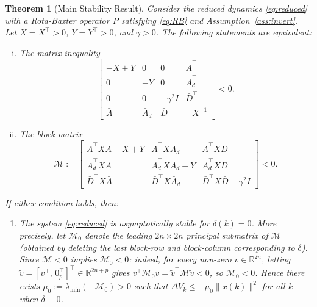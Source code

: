 \documentclass[10pt]{amsart}
\numberwithin{equation}{section}
\newtheorem{theorem}{Theorem}[section]
\begin{document}
\begin{theorem}[Main Stability Result]\label{thm:stability}
Consider the reduced dynamics \eqref{eq:reduced} with a Rota-Baxter operator \(P\)
satisfying \eqref{eq:RB} and Assumption~\ref{ass:invert}. Let $X = X^\top > 0$,
$Y = Y^\top > 0$, and $\gamma > 0$. The following statements are equivalent:
\begin{enumerate}[(i)]
  \item The matrix inequality
\begin{equation}\label{eq:LMI_schur}
\begin{bmatrix}
-X+Y & 0 & 0 & \bar{A}^\top \\
0 & -Y & 0 & \bar{A}_d^\top \\
0 & 0 & -\gamma^2 I & \bar{D}^\top \\
\bar{A} & \bar{A}_d & \bar{D} & -X^{-1}
\end{bmatrix} < 0.
\end{equation}
  \item The block matrix
\begin{equation}\label{eq:BMI_raw}
\mathcal{M} :=
\begin{bmatrix}
\bar{A}^\top X \bar{A} - X + Y & \bar{A}^\top X \bar{A}_d & \bar{A}^\top X \bar{D} \\
\bar{A}_d^\top X \bar{A} & \bar{A}_d^\top X \bar{A}_d - Y & \bar{A}_d^\top X \bar{D} \\
\bar{D}^\top X \bar{A} & \bar{D}^\top X \bar{A}_d & \bar{D}^\top X \bar{D} - \gamma^2 I
\end{bmatrix}
< 0.
\end{equation}
\end{enumerate}
If either condition holds, then:
\begin{enumerate}
  \item[(a)] The system \eqref{eq:reduced} is asymptotically stable for \(\delta(k)=0\).
             More precisely, let $\mathcal{M}_0$ denote the leading $2n \times 2n$
             principal submatrix of $\mathcal{M}$ (obtained by deleting the last
             block-row and block-column corresponding to $\delta$). Since
             $\mathcal{M} < 0$ implies $\mathcal{M}_0 < 0$: indeed, for every non-zero
             $v \in \mathbb{R}^{2n}$, letting
             $\tilde{v} = [v^\top,\, 0_{p}^\top]^\top \in \mathbb{R}^{2n+p}$ gives
             $v^\top \mathcal{M}_0 v = \tilde{v}^\top \mathcal{M}\tilde{v} < 0$,
             so $\mathcal{M}_0 < 0$. Hence there exists
             $\mu_0 := \lambda_{\min}(-\mathcal{M}_0) > 0$ such that
             $\Delta V_k \leq -\mu_0\|x(k)\|^2$ for all $k$ when $\delta \equiv 0$.

\end{enumerate}
\end{theorem}
\end{document}
